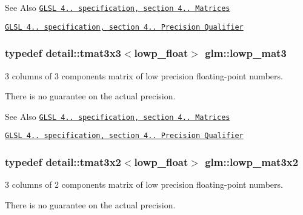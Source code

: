 \begin{DoxySeeAlso}{See Also}
\href{http://www.opengl.org/registry/doc/GLSLangSpec.4.20.8.pdf}{\tt G\-L\-S\-L 4.. specification, section 4.. Matrices} 

\href{http://www.opengl.org/registry/doc/GLSLangSpec.4.20.8.pdf}{\tt G\-L\-S\-L 4.. specification, section 4.. Precision Qualifier} 
\end{DoxySeeAlso}
\hypertarget{group__core__precision_gaf32a06a88eff09262459a4448abea9ad}{
\subsubsection[{lowp\-\_\-mat3}]{\setlength{\rightskip}{0pt plus 5cm}typedef detail\-::tmat3x3$<$lowp\-\_\-float$>$ {\bf glm\-::lowp\-\_\-mat3}}}\label{group__core__precision_gaf32a06a88eff09262459a4448abea9ad}


3 columns of 3 components matrix of low precision floating-\/point numbers. 

There is no guarantee on the actual precision.

\begin{DoxySeeAlso}{See Also}
\href{http://www.opengl.org/registry/doc/GLSLangSpec.4.20.8.pdf}{\tt G\-L\-S\-L 4.. specification, section 4.. Matrices} 

\href{http://www.opengl.org/registry/doc/GLSLangSpec.4.20.8.pdf}{\tt G\-L\-S\-L 4.. specification, section 4.. Precision Qualifier} 
\end{DoxySeeAlso}
\hypertarget{group__core__precision_ga590ba3600da3c6dc36a0eb7574cbd6f6}{
\subsubsection[{lowp\-\_\-mat3x2}]{\setlength{\rightskip}{0pt plus 5cm}typedef detail\-::tmat3x2$<$lowp\-\_\-float$>$ {\bf glm\-::lowp\-\_\-mat3x2}}}\label{group__core__precision_ga590ba3600da3c6dc36a0eb7574cbd6f6}


3 columns of 2 components matrix of low precision floating-\/point numbers. 

There is no guarantee on the actual precision.

